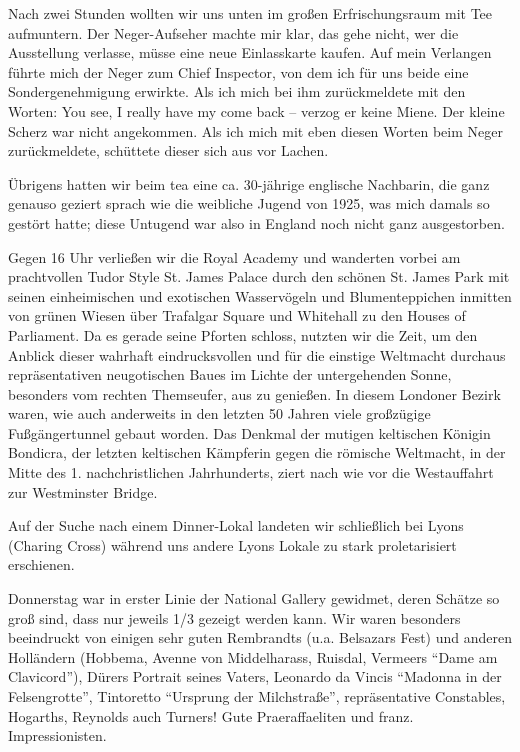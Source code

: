 Nach zwei Stunden wollten wir uns unten im großen Erfrischungsraum mit Tee aufmuntern. Der Neger-Aufseher machte mir klar, das gehe nicht, wer die Ausstellung verlasse, müsse eine neue Einlasskarte kaufen. Auf mein Verlangen führte mich der Neger zum Chief Inspector, von dem ich für uns beide eine Sondergenehmigung erwirkte. Als ich mich bei ihm zurückmeldete mit den Worten: You see, I really have my come back -- verzog er keine Miene. Der kleine Scherz war nicht angekommen. Als ich mich mit eben diesen Worten beim Neger zurückmeldete, schüttete dieser sich aus vor Lachen.

Übrigens hatten wir beim tea eine ca. 30-jährige englische Nachbarin, die ganz genauso geziert sprach wie die weibliche Jugend von 1925, was mich damals so gestört hatte; diese Untugend war also in England noch nicht ganz ausgestorben.

Gegen 16 Uhr verließen wir die Royal Academy und wanderten vorbei am prachtvollen Tudor Style St. James Palace durch den schönen St. James Park mit seinen einheimischen und exotischen Wasservögeln und Blumenteppichen inmitten von grünen Wiesen über Trafalgar Square und Whitehall zu den Houses of Parliament. Da es gerade seine Pforten schloss, nutzten wir die Zeit, um den Anblick dieser wahrhaft eindrucksvollen und für die einstige Weltmacht durchaus repräsentativen neugotischen Baues im Lichte der untergehenden Sonne, besonders vom rechten Themseufer, aus zu genießen. In diesem Londoner Bezirk waren, wie auch anderweits in den letzten 50 Jahren viele großzügige Fußgängertunnel gebaut worden. Das Denkmal der mutigen keltischen Königin Bondicra, der letzten keltischen Kämpferin gegen die römische Weltmacht, in der Mitte des 1. nachchristlichen Jahrhunderts, ziert nach wie vor die Westauffahrt zur Westminster Bridge.

Auf der Suche nach einem Dinner-Lokal landeten wir schließlich bei Lyons (Charing Cross) während uns andere Lyons Lokale zu stark proletarisiert erschienen.

Donnerstag war in erster Linie der National Gallery gewidmet, deren Schätze so groß sind, dass nur jeweils 1/3 gezeigt werden kann. Wir waren besonders beeindruckt von einigen sehr guten Rembrandts (u.a. Belsazars Fest) und anderen Holländern (Hobbema, Avenne von Middelharass, Ruisdal, Vermeers \enquote{Dame am Clavicord}), Dürers Portrait seines Vaters, Leonardo da Vincis \enquote{Madonna in der Felsengrotte}, Tintoretto \enquote{Ursprung der Milchstraße}, repräsentative Constables, Hogarths, Reynolds auch Turners! Gute Praeraffaeliten und franz. Impressionisten.

